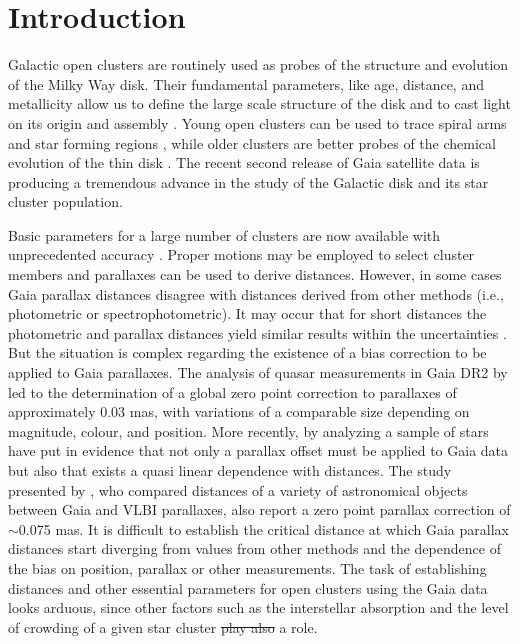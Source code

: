 \documentclass[draft]{aa}
\providecommand{\DIFaddtex}[1]{{\protect\color{blue}\uwave{#1}}} %
\providecommand{\DIFdeltex}[1]{{\protect\color{red}\sout{#1}}}                      %
\providecommand{\DIFaddbegin}{} %
\providecommand{\DIFaddend}{} %
\providecommand{\DIFdelbegin}{} %
\providecommand{\DIFdelend}{} %
\providecommand{\DIFadd}[1]{\texorpdfstring{\DIFaddtex{#1}}{#1}} %
\providecommand{\DIFdel}[1]{\texorpdfstring{\DIFdeltex{#1}}{}} %
\newcommand{\DIFscaledelfig}{0.5}
\newlength{\DIFdelgraphicswidth} %
\newlength{\DIFdelgraphicsheight} %
\newcommand{\DIFaddincludegraphics}[2][]{{\color{blue}\fbox{\DIFOincludegraphics[#1]{#2}}}} %
\newcommand{\DIFdelincludegraphics}[2][]{%
\sbox{\DIFdelgraphicsbox}{\DIFOincludegraphics[#1]{#2}}%
\settoboxwidth{\DIFdelgraphicswidth}{\DIFdelgraphicsbox} %
\settoboxtotalheight{\DIFdelgraphicsheight}{\DIFdelgraphicsbox} %
\scalebox{\DIFscaledelfig}{%
\parbox[b]{\DIFdelgraphicswidth}{\usebox{\DIFdelgraphicsbox}\\[-\baselineskip] \rule{\DIFdelgraphicswidth}{0em}}\llap{\resizebox{\DIFdelgraphicswidth}{\DIFdelgraphicsheight}{%
\setlength{\unitlength}{\DIFdelgraphicswidth}%
\begin{picture}(1,1)%
\thicklines\linethickness{2pt} %
{\color[rgb]{1,0,0}\put(0,0){\framebox(1,1){}}}%
{\color[rgb]{1,0,0}\put(0,0){\line( 1,1){1}}}%
{\color[rgb]{1,0,0}\put(0,1){\line(1,-1){1}}}%
\end{picture}%
}\hspace*{3pt}}} %
} %
\DeclareRobustCommand{\DIFaddbegin}{\DIFOaddbegin \let\includegraphics\DIFaddincludegraphics} %
\DeclareRobustCommand{\DIFaddend}{\DIFOaddend \let\includegraphics\DIFOincludegraphics} %
\DeclareRobustCommand{\DIFdelbegin}{\DIFOdelbegin \let\includegraphics\DIFdelincludegraphics} %
\DeclareRobustCommand{\DIFdelend}{\DIFOaddend \let\includegraphics\DIFOincludegraphics} %
\begin{document}
\section{Introduction}

Galactic open clusters are routinely used as probes of the structure and
evolution of the Milky Way disk. Their fundamental parameters, like age,
distance, and metallicity allow us to define the large scale structure of the
disk and to cast light on its origin and assembly \citep{Janes_1982,
Moitinho_2010,2018A&A...618A..93C}. Young open clusters can be used to trace
spiral arms and star forming regions \citep{Moitinho_2006,Vazquez2008}, while
older clusters are better probes of the chemical evolution of the thin disk
\citep{2009yCat..35120063M}. The recent second release of Gaia satellite data
\citep{GaiaDR2_2018} is producing a tremendous advance in the study of the
Galactic disk and its star cluster population.

Basic parameters for a large number of clusters are now available with
unprecedented accuracy \citep{2018A&A...618A..93C,Soubiran_2018,Bossini_2019,
Monteiro_2019}. Proper motions may be employed to select cluster members and
parallaxes can be used to derive distances. However, in some cases Gaia
parallax distances disagree with distances derived from other methods 
(i.e., photometric or spectrophotometric). It may occur that for
short distances the photometric and parallax distances yield similar results
within the uncertainties \citep{2018A&A...618A..93C}. But the situation is
complex regarding the existence of a bias correction to be applied to
Gaia parallaxes. The analysis of quasar measurements in Gaia DR2 by
\cite{Lindegren_2018} led to the determination of a global zero point
correction to parallaxes of approximately 0.03 mas, with variations of a
comparable size depending on magnitude, colour, and position.
More recently, by analyzing a sample of stars \cite{Schonrich2019} have put in
evidence that not only a parallax offset must be applied to Gaia data but also
that exists a quasi linear dependence with distances. The study presented by 
\cite{Xu_2019}, who compared distances of a variety of astronomical objects
between Gaia and VLBI parallaxes, also report a zero point parallax correction
of $\sim$0.075 mas.
It is difficult to establish the critical distance at which Gaia parallax
distances start diverging from values from other methods and the dependence of
the bias on position, parallax or other measurements. The  task of
establishing distances and other essential parameters for open clusters using
the Gaia data looks arduous, since other factors such as the interstellar
absorption and the level of crowding of a given star cluster \DIFdelbegin \DIFdel{play also }\DIFdelend \DIFaddbegin \DIFadd{also play }\DIFaddend a
role.
\end{document}
